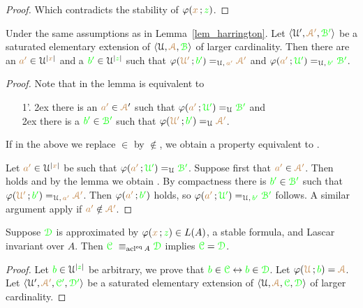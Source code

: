 \documentclass[creche.tex]{subfiles}
\begin{document}
{\begin{proof}
{}

Which contradicts the stability of $\varphi({\color{brown} x}\,;{\color{green} z})$.
\end{proof}



\def\mrsA{{\mr\Aa'}}
\def\grsB{{\gr\B'}}
\begin{corollary}
Under the same assumptions as in Lemma~\ref{lem_harrington}. Let $\<\U',\mrsA,\grsB\>$ be a saturated  elementary extension of  $\<\U,\mrA,\grB\>$ of larger cardinality. Then there are an  ${\color{brown} a'}\in\EuScript U^{|{\color{brown} x}|}$ and a ${\color{green} b'}\in\EuScript U^{|{\color{green} z}|}$ such that $\phi({\mr\U'}\,;{\gr b'})=_{\U,\, {\mr a'}}\mrsA$ and $\phi({\mr a'}\,;{\gr\U'})=_{\U,\,{\gr b'}}\grsB$.
\end{corollary}
\begin{proof}
Note that  in the lemma is equivalent to

\begin{itemize}
\item[1'.]
\kern2ex there is an ${\mr a'}\in{\mrA'}$  such that $\phi({\mr a'}\,;{\gr\U'})=_{\U}\grsB$ and\\
\kern2ex   there is a\phantom{n} ${\gr b'}\in\grsB$ such that $\phi({\mr\U'}\,;{\gr b'})=_{\U}\mrsA$. 
\end{itemize}

If in the above we replace $\in$ by $\notin$, we obtain a property equivalent to .

Let  ${\color{brown} a'}\in\EuScript U^{|{\color{brown} x}|}$ be such that $\phi({\mr a'}\,;{\gr\U'})=_{\U}\grsB$. Suppose first that ${\mr a'}\in\mrsA$. Then  holds and by the lemma we obtain . By compactness there is ${\gr b'}\in\grsB$ such that $\phi({\mr\U'}\,;{\gr b'})=_{\U,\,{\mr a'}}\mrsA$. Then $\varphi({\color{brown} a'}\,;{\color{green} b'})$ holds, so $\phi({\mr a'}\,;{\gr\U'})=_{\U,\,{\gr b'}}\grsB$ follows. A similar argument apply if  ${\mr a'}\notin\mrsA$.
\end{proof}
\begin{proposition}
Suppose ${\color{green}\EuScript D}$ is approximated by $\varphi({\color{brown} x}\,;{\color{green} z})\in L(A)$, a stable formula, and Lascar invariant over $A$.  Then ${\color{green}\EuScript C}\ \equiv_{\mathop{\rm acl}^{{\rm eq}} A}{\color{green}\EuScript D}$ implies ${\color{green}\EuScript C}={\color{green}\EuScript D}$. 
\end{proposition}

\begin{proof}
\def\grsC{{\gr\C'}}
\def\grsD{{\gr\D'}}
\def\mrA{{\mr\Aa}}
\def\mrsA{{\mr\Aa'}}
Let ${\color{green} b}\in\EuScript U^{|{\color{green} z}|}$ be arbitrary, we prove that ${\color{green} b}\in{\color{green}\EuScript C}\leftrightarrow{\color{green}b}\in{\color{green}\EuScript D}$. Let $\phi({\mr\U}\,;{\gr b})=\mrA$. Let $\<\U',\mrsA,\grsC,\grsD\>$ be a saturated elementary extension of $\<\U,\mrA, \grC,\grD\>$ of larger cardinality. 


\end{proof}}
\end{document}
